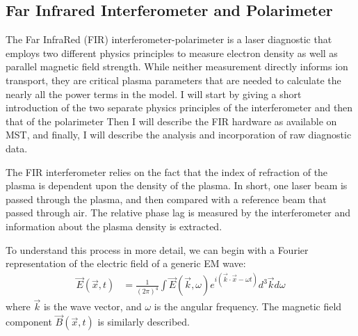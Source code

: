 \subsection{Far Infrared Interferometer and Polarimeter}
The Far InfraRed (FIR) interferometer-polarimeter is a laser diagnostic that employs two different physics principles to measure electron density as well as parallel magnetic field strength. While neither measurement directly informs ion transport, they are critical plasma parameters that are needed to calculate the nearly all the power terms in the model. I will start by giving a short introduction of the two separate physics principles of the interferometer and then that of the polarimeter Then I will describe the FIR hardware as available on MST, and finally, I will describe the analysis and incorporation of raw diagnostic data. 

The FIR interferometer relies on the fact that the index of refraction of the plasma is dependent upon the density of the plasma. In short, one laser beam is passed through the plasma, and then compared with a reference beam that passed through air. The relative phase lag is measured by the interferometer and information about the plasma density is extracted. 

To understand this process in more detail, we can begin with a Fourier representation of the electric field of a generic EM wave:
\begin{align}\label{eqn:fir_wave}
    \vec{E}(\vec{x}, t) &= \frac{1}{(2\pi)^4}\int\vec{E}(\vec{k},\omega)e^{i(\vec{k}\cdot\vec{x}-\omega t)}d^3\vec{k}d\omega 
\end{align}
where $\vec{k}$ is the wave vector, and $\omega$ is the angular frequency. The magnetic field component $\vec{B}(\vec{x},t)$ is similarly described.

